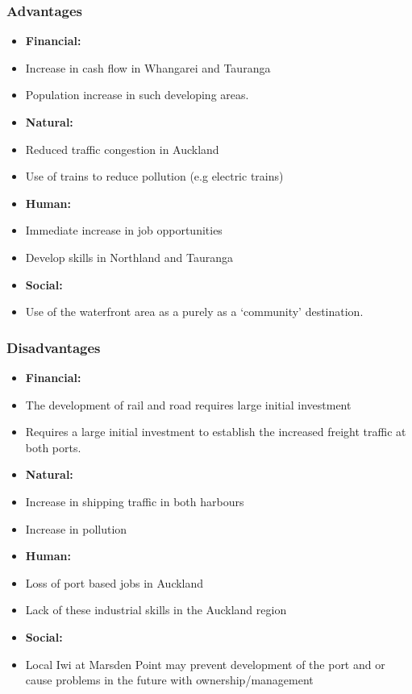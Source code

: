 \begin{multicols}{2}
    \subsubsection*{Advantages}
    \begin{itemize}[noitemsep]
        \item []\textbf{Financial: }
        \item{Increase in cash flow in Whangarei and Tauranga}
        \item{Population increase in such developing areas.}
        \item []\textbf{Natural: }
        \item{Reduced traffic congestion in Auckland}
        \item{Use of trains to reduce pollution (e.g electric trains)}
        \item []\textbf{Human: }
        \item{Immediate increase in job opportunities}
        \item{Develop skills in Northland and Tauranga}
        \item []\textbf{Social: }
        \item{Use of the waterfront area as a purely as a ‘community’ destination.}
    \end{itemize}
    \subsubsection*{Disadvantages}
    \begin{itemize}[noitemsep]
        \item []\textbf{Financial: }
        \item{The development of rail and road requires large initial investment}
        \item{Requires a large initial investment to establish the increased freight traffic at both ports.}
        \item []\textbf{Natural: }
        \item{Increase in shipping traffic in both harbours}
        \item{Increase in pollution}
        \item []\textbf{Human: }
        \item{Loss of port based jobs in Auckland}
        \item{Lack of these industrial skills in the Auckland region}
        \item []\textbf{Social: }
        \item{Local Iwi at Marsden Point may prevent development of the port and or cause problems in the future with ownership/management}
    \end{itemize}


\end{multicols}
